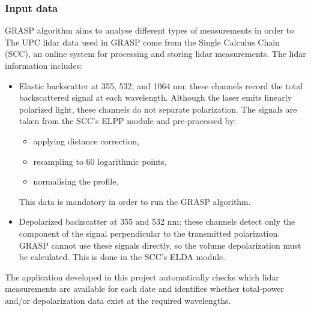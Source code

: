 \subsubsection{Input data}
GRASP algorithm aims to analyse different types of measurements in order to 
The UPC lidar data used in GRASP come from the Single Calculus Chain (SCC), an online system for processing and storing lidar measurements.
The lidar information includes:
\begin{itemize}
  \item Elastic backscatter at 355, 532, and 1064 nm: these channels record the total backscattered signal at each wavelength. Although the laser emits linearly polarized light, these channels do not separate polarization. The signals are taken from the SCC’s ELPP module and pre‑processed by:
    \begin{itemize}
      \item applying distance correction,
      \item resampling to 60 logarithmic points,
      \item normalising the profile.
    \end{itemize}
    This data is mandatory in order to run the GRASP algorithm.
  \item Depolarized backscatter at 355 and 532 nm: these channels detect only the component of the signal perpendicular to the transmitted polarization. GRASP cannot use these signals directly, so the volume depolarization must be calculated. This is done in the SCC’s ELDA module.
\end{itemize}
The application developed in this project automatically checks which lidar measurements are available for each date and identifies whether total‑power and/or depolarization data exist at the required wavelengths.
